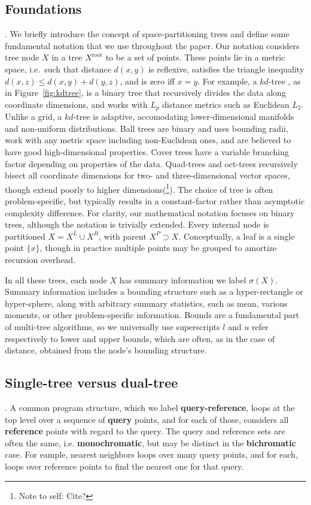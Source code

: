 \documentclass[twoside,leqno,twocolumn]{article}
\newcommand{\authornote}[1]{(\footnote{Note to self: #1})}
\newcommand{\authorsnote}[1]{\authornote{#1}}
\newcommand{\union}{\cup}
\newcommand{\fig}[1]{Figure~\ref{fig:#1}}
\newcommand{\mysub}[1]{\subsection{#1}. }
\newcommand{\defterm}[1]{{\bf #1}}
\newcommand{\kdroot}[1]{#1^{\text{root}}}
\newcommand{\kdleft}[1]{#1^{\!L}}
\newcommand{\kdright}[1]{#1^{\!R}}
\newcommand{\kdparent}[1]{#1^{\!P}}
\newcommand{\dist}[2]{d(#1,#2)}
\newcommand{\outstat}{\sigma}
\begin{document}
\mysub{Foundations}
We briefly introduce the concept of space-partitioning trees and define some fundamental notation that we use throughout the paper.
Our notation considers tree node $X$ in a tree $\kdroot{X}$ to be a set of points.
These points lie in a metric space, i.e.~such that distance $\dist{x}{y}$ is reflexive, satisfies the triangle inequality $\dist{x}{z} \leq \dist{x}{y} + \dist{y}{z}$, and is zero iff $x = y$.
For example, a $kd$-tree \cite{preparata_kdtrees}, as in \fig{kdtree}, is a binary tree that recursively divides the data along coordinate dimensions, and works with $L_p$ distance metrics such as Euclidean $L_2$.
Unlike a grid, a $kd$-tree is adaptive, accomodating lower-dimensional manifolds and non-uniform distributions.
Ball trees \cite{anchors_balltrees_moore} are binary and uses bounding radii, work with any metric space including non-Euclidean ones, and are believed to have good high-dimensional properties.
Cover trees \cite{covertrees} have a variable branching factor depending on properties of the data.
Quad-trees and oct-trees recursively bisect all coordinate dimensions for two- and three-dimensional vector spaces, though extend poorly to higher dimensions\authorsnote{Cite?}.
The choice of tree is often problem-specific, but typically results in a constant-factor rather than asymptotic complexity difference.
For clarity, our mathematical notation focuses on binary trees, although the notation is trivially extended.
Every internal node is partitioned $X = \kdleft{X} \union \kdright{X}$, with parent $\kdparent{X} \supset X$.
Conceptually, a leaf is a single point $\{x\}$, though in practice multiple points may be grouped to amortize recursion overhead.

In all these trees, each node $X$ has summary information we label $\outstat(X)$.
Summary information includes a bounding structure such as a hyper-rectangle or hyper-sphere, along with arbitrary summary statistics, such as mean, various moments, or other problem-specific information.
Bounds are a fundamental part of multi-tree algorithms, so we universally use superscripts $l$ and $u$ refer respectively to lower and upper bounds, which are often, as in the case of distance, obtained from the node's bounding structure.

\mysub{Single-tree versus dual-tree}
A common program structure, which we label \defterm{query-reference}, loops at the top level over a sequence of \defterm{query} points, and for each of those, considers all \defterm{reference} points with regard to the query.
The query and reference sets are often the same, i.e. \defterm{monochromatic}, but may be distinct in the \defterm{bichromatic} case.
For eample, nearest neighbors loops over many query points, and for each, loops over reference points to find the nearest one for that query.
\end{document}
